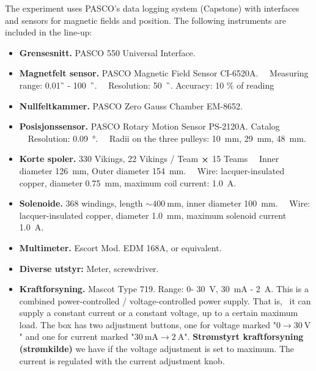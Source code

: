 \documentclass[../Elmag-labhefte-2020.tex]{subfiles}
\begin{document}
The experiment uses PASCO's data logging system (Capstone) with interfaces and sensors for magnetic fields and position.
The following instruments are included in the line-up:
\vspace{-4mm}
\begin{itemize}
    \item \textbf{Grensesnitt.} PASCO 550 Universal Interface.
    \item \textbf{Magnetfelt sensor.} PASCO Magnetic Field Sensor CI-6520A. \ \
    Measuring range: \SI{0,01}{\G} - \SI{100}{\kilo\G}. \ \
    Resolution: \SI{50}{\milli\G}.
    Accuracy: 10 \% of reading
    \item \textbf{Nullfeltkammer.} PASCO Zero Gauss Chamber EM-8652.
    \item \textbf{Posisjonssensor.} PASCO Rotary Motion Sensor PS-2120A. Catalog \ \
    Resolution: \SI{0,09}{\degree}. \ \
    Radii on the three pulleys: \SI{10}{\mm}, \SI{29}{\mm}, \SI{48}{\mm}.
    \item \textbf{Korte spoler.} 330 Vikings, 22 Vikings / Team $\cross$ 15 Teams \ \
    Inner diameter \SI{126}{\mm}, Outer diameter \SI{154}{\mm}. \ \
    Wire: lacquer-insulated copper, diameter \SI{0,75}{\mm}, maximum coil current: \SI{1,0}{\ampere}.
    \item \textbf{Solenoide.} 368 windings, length $\sim \SI{400}{\mm}$, inner diameter \SI{100}{\mm}. \ \
    Wire: lacquer-insulated copper, diameter \SI{1,0}{\mm}, maximum solenoid current \SI{1,0}{\ampere}.
    \item \textbf{Multimeter.} Escort Mod. EDM 168A, or equivalent.
    \item \textbf{Diverse utstyr:} Meter, screwdriver.
    \item \textbf{Kraftforsyning.} Mascot Type 719. Range: 0- \SI{30}{\volt}, \SI{30}{\milli\ampere} - \SI{2}{\ampere}. \label{magnetfelt.kraftforsyning}
    This is a combined power-controlled / voltage-controlled power supply. That is, \ it can supply a constant current or a constant voltage, up to a certain maximum load. The box has two adjustment buttons, one for voltage marked "$0 \rightarrow \SI{30}{\volt}$" and one for current marked "$\SI{30}{\milli\ampere} \rightarrow \SI{2}{\ampere}$".
    \textbf{Strømstyrt kraftforsyning (strømkilde)} we have if the voltage adjustment is set to maximum. The current is regulated with the current adjustment knob.

\end{itemize}
\end{document}
